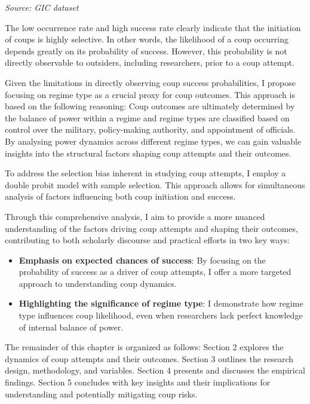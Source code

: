 \documentclass[
  12pt,
]{report}
\begin{document}
\begin{minipage}{\linewidth}
\emph{Source: GIC dataset}\\
\end{minipage}
\endgroup

The low occurrence rate and high success rate clearly indicate that the
initiation of coups is highly selective. In other words, the likelihood
of a coup occurring depends greatly on its probability of success.
However, this probability is not directly observable to outsiders,
including researchers, prior to a coup attempt.

Given the limitations in directly observing coup success probabilities,
I propose focusing on regime type as a crucial proxy for coup outcomes.
This approach is based on the following reasoning: Coup outcomes are
ultimately determined by the balance of power within a regime and regime
types are classified based on control over the military, policy-making
authority, and appointment of officials. By analysing power dynamics
across different regime types, we can gain valuable insights into the
structural factors shaping coup attempts and their outcomes.

To address the selection bias inherent in studying coup attempts, I
employ a double probit model with sample selection. This approach allows
for simultaneous analysis of factors influencing both coup initiation
and success.

Through this comprehensive analysis, I aim to provide a more nuanced
understanding of the factors driving coup attempts and shaping their
outcomes, contributing to both scholarly discourse and practical efforts
in two key ways:

\begin{itemize}
\item
  \textbf{Emphasis on expected chances of success}: By focusing on the
  probability of success as a driver of coup attempts, I offer a more
  targeted approach to understanding coup dynamics.
\item
  \textbf{Highlighting the significance of regime type}: I demonstrate
  how regime type influences coup likelihood, even when researchers lack
  perfect knowledge of internal balance of power.
\end{itemize}

The remainder of this chapter is organized as follows: Section 2
explores the dynamics of coup attempts and their outcomes. Section 3
outlines the research design, methodology, and variables. Section 4
presents and discusses the empirical findings. Section 5 concludes with
key insights and their implications for understanding and potentially
mitigating coup risks.
\end{document}
